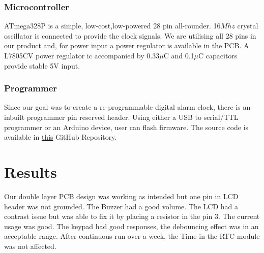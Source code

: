 \subsection{Microcontroller}

ATmega328P is a simple, low-cost,low-powered 28 pin all-rounder. 16$Mhz$ crystal oscillator is connected to provide the clock signals. We are utilising all 28 pins in our product and, for power input a power regulator is available in the PCB.
A L7805CV power regulator ic accompanied by 0.33$\mu$C and 0.1$\mu$C capacitors provide stable 5V input.

\begin{minipage}{0.97\textwidth}
 \noindent{}\hfill
\end{minipage}

\subsection{Programmer}

Since our goal was to create a re-programmable digital alarm clock, there is an inbuilt programmer pin reserved header. Using either a USB to serial/TTL programmer or an Arduino device, user can flash firmware. The source code is available in \href{https://github.com/dakshinatharindu/Digital-Alarm-Clock}{this} GitHub Repository.

\chapter{Results}
Our double layer PCB design was working as intended but one pin in LCD header was not grounded. The Buzzer had a good volume. The LCD had a contrast issue but was able to fix it by placing a resistor in the pin 3. The current usage was good. The keypad had good responses, the debouncing effect was in an acceptable range. After continuous run over a week, the Time in the RTC module was not affected.

